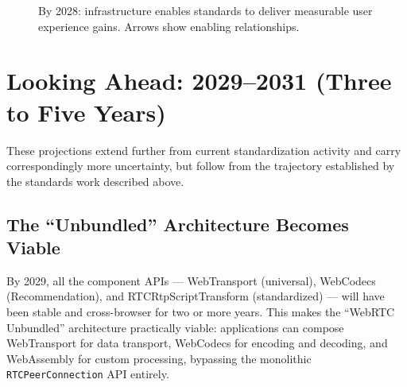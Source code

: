 \documentclass[11pt]{article}
\begin{document}
\begin{figure}[ht]
\caption{By 2028: infrastructure enables standards to deliver measurable
  user experience gains. Arrows show enabling relationships.}
\label{fig:2028-stack}
\end{figure}

\section{Looking Ahead: 2029--2031 (Three to Five Years)}

These projections extend further from current standardization activity and
carry correspondingly more uncertainty, but follow from the trajectory
established by the standards work described above.

\subsection{The ``Unbundled'' Architecture Becomes Viable}

By 2029, all the component APIs --- WebTransport (universal), WebCodecs
(Recommendation), and RTCRtpScriptTransform (standardized) --- will have been
stable and cross-browser for two or more years. This makes the ``WebRTC
Unbundled'' architecture practically viable: applications can compose
WebTransport for data transport, WebCodecs for encoding and decoding, and
WebAssembly for custom processing, bypassing the monolithic
\texttt{RTCPeerConnection} API entirely.
\end{document}

